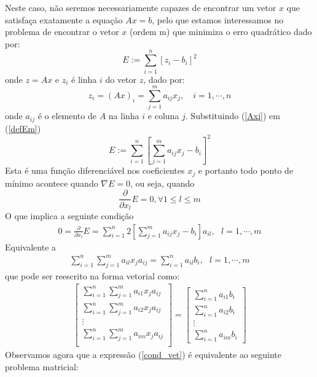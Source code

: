 \documentclass[main.tex]{subfiles}
\begin{document}
Neste caso, não seremos necessariamente capazes de encontrar um vetor $x$ que satisfaça exatamente a equação $Ax=b$, pelo que estamos interessamos no problema de encontrar o vetor $x$ (ordem m) que minimiza o erro quadrático dado por:
\begin{equation}\label{defEm}
E:=\sum_{i=1}^n \left[z_i- b_i\right]^2
\end{equation}
onde $z=Ax$ e $z_i$ é linha $i$ do vetor $z$, dado por:
\begin{equation}\label{Axi}
z_i=(Ax)_i=\sum_{j=1}^m a_{ij} x_j,\quad i=1,\cdots,n
\end{equation}
onde $a_{ij}$ é o elemento de $A$ na linha $i$ e coluna $j$.
Substituindo (\ref{Axi}) em (\ref{defEm})
\begin{equation}\label{erro}
E:=\sum_{i=1}^n \left[\sum_{j=1}^m a_{ij} x_j- b_i\right]^2
\end{equation}
Esta é uma função diferenciável nos coeficientes $x_j$ e portanto todo ponto de mínimo acontece quando $\nabla E=0$, ou seja, quando $$\frac{\partial}{\partial x_l}E=0,\forall 1\leq l \leq m $$
O que implica a seguinte condição
\begin{eqnarray*}
0=\frac{\partial}{\partial x_l}E=\sum_{i=1}^n 2\left[\sum_{j=1}^m a_{ij} x_j- b_i\right] a_{il}, ~~~l=1,\cdots, m
\end{eqnarray*}
Equivalente a
\begin{eqnarray*}
\sum_{i=1}^n\sum_{j=1}^m  a_{il}x_j a_{ij}=\sum_{i=1}^na_{il}b_i,~~~l=1,\cdots, m
\end{eqnarray*}
que pode ser reescrito na forma vetorial como:
\begin{eqnarray}\label{cond_vet}
\left[
\begin{array}{c}
\sum_{i=1}^n\sum_{j=1}^m   a_{i1}x_ja_{ij}\\
\sum_{i=1}^n\sum_{j=1}^m   a_{i2}x_ja_{ij}\\
\vdots\\
\sum_{i=1}^n\sum_{j=1}^m   a_{im}x_ja_{ij}\\
\end{array}
\right]
=
\left[
\begin{array}{c}
\sum_{i=1}^na_{i1}b_i\\
\sum_{i=1}^na_{i2}b_i\\
\vdots\\
\sum_{i=1}^na_{im}b_i
\end{array}
\right]
\end{eqnarray}
Observamos agora que a expressão (\ref{cond_vet}) é equivalente ao seguinte problema matricial:
\end{document}
